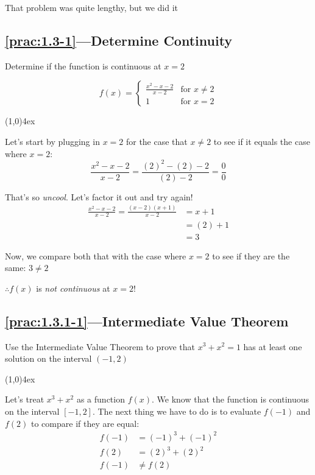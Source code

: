 \documentclass{MathNotes}
\newcommand{\br}{
\begin{center}
\line(1,0){4ex}
\end{center}}
\begin{document}
That problem was quite lengthy, but we did it 

\newpage
\subsection*{\ref{prac:1.3-1}---Determine Continuity}\label{ans:1.3-1}
Determine if the function is continuous at $x=2$

\begin{displaymath}
    f(x) = \begin{cases}
        \frac{x^2-x-2}{x-2} &\text{for } x\neq 2\\
        1 &\text{for } x=2
    \end{cases}
\end{displaymath}
\br

Let's start by plugging in $x=2$ for the case that $x\neq2$ to see if it equals
the case where $x=2$:
\begin{displaymath}
    \frac{x^2-x-2}{x-2}=\frac{(2)^2-(2)-2}{(2)-2}=\frac{0}{0}
\end{displaymath}

That's so \textit{uncool}. Let's factor it out and try again!
\begin{align*}
    \frac{x^2-x-2}{x-2} = \frac{(x-2)(x+1)}{x-2} &= x+1\\
    &=(2)+1\\
    &=3
\end{align*}

Now, we compare both that with the case where $x=2$ to see if they
are the same: $3\neq2$

$\therefore f(x)$ is \textit{not continuous} at $x=2$!

\subsection*{\ref{prac:1.3.1-1}---Intermediate Value Theorem}\label{ans:1.3.1-1}
Use the Intermediate Value Theorem to prove that $x^3+x^2=1$ has at least
one solution on the interval $(-1, 2)$
\br
Let's treat $x^3+x^2$ as a function $f(x)$. We know that the function is 
continuous on the interval $[-1, 2]$. The next thing we have to do is to 
evaluate $f(-1)$ and $f(2)$ to compare if they are equal:
\begin{align*}
    f(-1)&=(-1)^3+(-1)^2\\
    f(2)&=(2)^3+(2)^2\\
    f(-1)&\neq f(2)\\
\end{align*}
\end{document}
